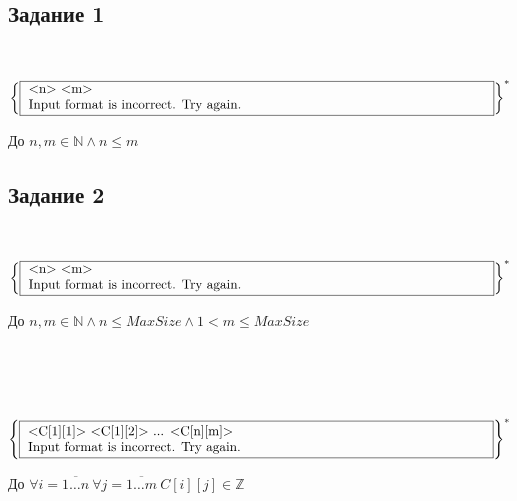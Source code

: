 \subsection*{Задание 1}
\\[0.3cm]
\noindent
\begin{minipage}{0.4\textwidth}
    \(\left\{
        \fbox{
            \parbox{\textwidth} {
                \text{<n> <m>}\\
                \text{Input format is incorrect. Try again.}  
            }
        }
    \right\}^{*}\) 
\end{minipage}%
\hfill
\begin{minipage}{0.5\textwidth}
    До \(n, m \in \mathbb{N} \land n \leq m\) 
\end{minipage}
\subsection*{Задание 2}
\\[0.3cm]
\noindent
\begin{minipage}{0.4\textwidth}
    \(\left\{
        \fbox{
            \parbox{\textwidth} {
                \text{<n> <m>}\\
                \text{Input format is incorrect. Try again.}  
            }
        }
    \right\}^{*}\) 
\end{minipage}%
\hfill
\begin{minipage}{0.5\textwidth}
    До \(n, m \in \mathbb{N} \land n \leq MaxSize \land 1 < m \leq MaxSize\) 
\end{minipage}%
\\[0.3cm]
\\[0.3cm]
\\[0.3cm]
\noindent
\begin{minipage}{0.4\textwidth}
    \(\left\{
        \fbox{
            \parbox{\textwidth} {
                \text{<C[1][1]> <C[1][2]> ... <C[n][m]>}\\
                \text{Input format is incorrect. Try again.}  
            }
        }
    \right\}^{*}\) 
\end{minipage}%
\hfill
\begin{minipage}{0.5\textwidth}
    До \(\forall i = \overline{1 \dots n}\ \forall j = \overline{1 \dots m}\ C[i][j] \in \mathbb{Z}\) 
\end{minipage}%
\\[0.3cm]
